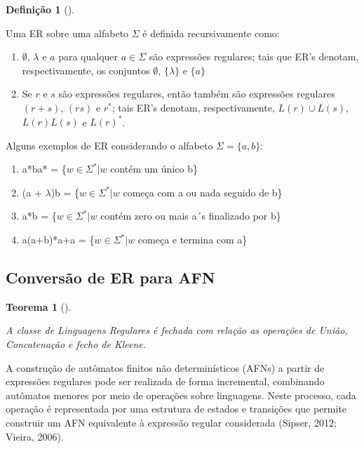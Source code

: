 \documentclass[
  brazilian,
  letterpaper,
]{book}
\theoremstyle{plain}
\newtheorem{theorem}{Teorema}[chapter]
\theoremstyle{definition}
\newtheorem{definition}{Definição}[chapter]
\theoremstyle{remark}
\begin{document}
\begin{definition}[]\protect\hypertarget{def-expressao-regular}{}\label{def-expressao-regular}

Uma ER sobre uma alfabeto \(\Sigma\) é definida recursivamente como:

\begin{enumerate}
\def\labelenumi{\arabic{enumi}.}
\item
  \(\emptyset\), \(\lambda\) e \(a\) para qualquer \(a \in \Sigma\) são
  expressões regulares; tais que ER's denotam, respectivamente, os
  conjuntos \(\emptyset\), \(\{\lambda\}\) e \(\{a\}\)
\item
  Se \(r\) e \(s\) são expressões regulares, então também são expressões
  regulares \((r+s)\), \((rs)\) e \(r^*\); tais ER's denotam,
  respectivamente, \(L(r) \cup L(s)\), \(L(r)L(s)\) e \(L(r)^*\).
\end{enumerate}

\end{definition}

Alguns exemplos de ER considerando o alfabeto \(\Sigma = \{a, b\}\):

\begin{enumerate}
\def\labelenumi{\arabic{enumi}.}
\item
  a*ba* = \{\(w \in \Sigma^* | w\) contém um único b\}
\item
  (a + \(\lambda\))b = \{\(w \in \Sigma^* | w\) começa com a ou nada
  seguido de b\}
\item
  a*b = \{\(w \in \Sigma^* | w\) contém zero ou mais a´s finalizado por
  b\}
\item
  a(a+b)*a+a = \{\(w \in \Sigma^* | w\) começa e termina com a\}
\end{enumerate}

\subsection{Conversão de ER para AFN}\label{conversuxe3o-de-er-para-afn}

\begin{theorem}[]\protect\hypertarget{thm-fecho-regular}{}\label{thm-fecho-regular}

A classe de Linguagens Regulares é fechada com relação as operações de
União, Concatenação e fecho de Kleene.

\end{theorem}

A construção de autômatos finitos não determinísticos (AFNs) a partir de
expressões regulares pode ser realizada de forma incremental, combinando
autômatos menores por meio de operações sobre linguagens. Neste
processo, cada operação é representada por uma estrutura de estados e
transições que permite construir um AFN equivalente à expressão regular
considerada (Sipser, 2012; Vieira, 2006).
\end{document}
